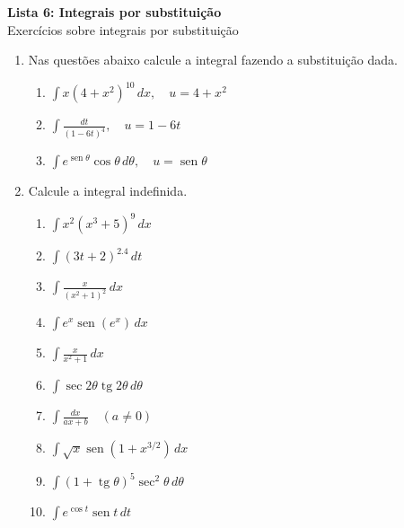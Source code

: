 \documentclass[12pt,a4paper]{article}
\begin{document}
\vspace{0.2cm}

\begin{center}
  {\LARGE\bfseries\color{primary} Lista 6: Integrais por substituição} \\[0.1cm]
  {\small\sffamily\color{gray} Exercícios sobre integrais por substituição}
\end{center}




\vspace{0.4cm}

\begin{enumerate}
 \item Nas questões abaixo calcule a integral fazendo a substituição dada.
 
 
 \begin{enumerate}

\item $\displaystyle \int x(4 + x^2)^{10} \, dx, \quad u = 4 + x^2$

\item $\displaystyle \int \frac{dt}{(1 - 6t)^4}, \quad u = 1 - 6t$

\item $\displaystyle \int e^{\operatorname{sen} \theta} \cos \theta \, d\theta, \quad u = \operatorname{sen} \theta$

\end{enumerate}

\item Calcule a integral indefinida.

\begin{enumerate}

    \item $\displaystyle \int x^2(x^3 + 5)^9 \, dx$

    \item $\displaystyle \int (3t + 2)^{2.4} \, dt$

    \item $\displaystyle \int \frac{x}{(x^2 + 1)^2} \, dx$

    \item $\displaystyle \int e^x \operatorname{sen}(e^x) \, dx$

    \item $\displaystyle \int \frac{x}{x^2 + 1} \, dx$

    \item $\displaystyle \int \sec 2\theta \operatorname{tg} 2\theta \, d\theta$

    \item $\displaystyle \int \frac{dx}{ax + b} \quad (a \neq 0)$

    \item $\displaystyle \int \sqrt{x} \operatorname{sen}(1 + x^{3/2}) \, dx$

    \item $\displaystyle \int (1 + \operatorname{tg} \theta)^5 \sec^2 \theta \, d\theta$

    \item $\displaystyle \int e^{\cos t} \operatorname{sen} t \, dt$
\end{enumerate}

\end{enumerate}
\end{document}
